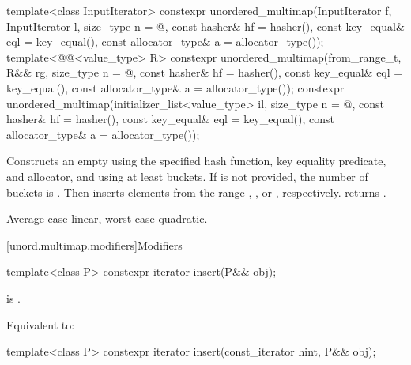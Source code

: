 %
\begin{itemdecl}
template<class InputIterator>
  constexpr unordered_multimap(InputIterator f, InputIterator l,
                               size_type n = @\seebelow@, const hasher& hf = hasher(),
                               const key_equal& eql = key_equal(),
                               const allocator_type& a = allocator_type());
template<@@<value_type> R>
  constexpr unordered_multimap(from_range_t, R&& rg,
                               size_type n = @\seebelow@, const hasher& hf = hasher(),
                               const key_equal& eql = key_equal(),
                               const allocator_type& a = allocator_type());
constexpr unordered_multimap(initializer_list<value_type> il,
                             size_type n = @\seebelow@, const hasher& hf = hasher(),
                             const key_equal& eql = key_equal(),
                             const allocator_type& a = allocator_type());
\end{itemdecl}

\begin{itemdescr}
\pnum
\effects
Constructs an empty  using the
specified hash function, key equality predicate, and allocator, and
using at least  buckets. If  is not
provided, the number of buckets is . Then
inserts elements from the range , , or ,
respectively.
 returns .

\pnum
\complexity
Average case linear, worst case quadratic.
\end{itemdescr}

[unord.multimap.modifiers]{Modifiers}

%
\begin{itemdecl}
template<class P>
  constexpr iterator insert(P&& obj);
\end{itemdecl}

\begin{itemdescr}
\pnum
\constraints
{} is .

\pnum
\effects
Equivalent to: 
\end{itemdescr}

%
\begin{itemdecl}
template<class P>
  constexpr iterator insert(const_iterator hint, P&& obj);
\end{itemdecl}

